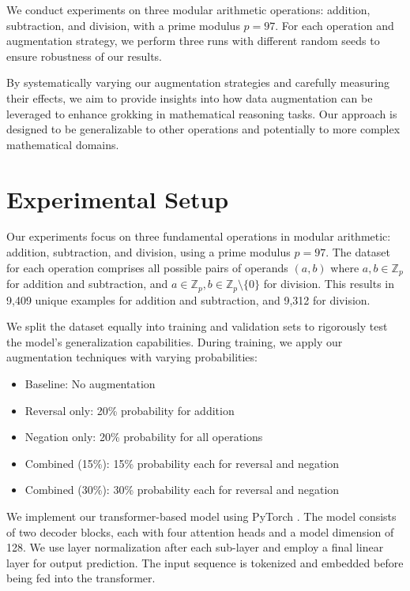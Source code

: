 \documentclass{article} %
\begin{document}
We conduct experiments on three modular arithmetic operations: addition, subtraction, and division, with a prime modulus $p = 97$. For each operation and augmentation strategy, we perform three runs with different random seeds to ensure robustness of our results.

By systematically varying our augmentation strategies and carefully measuring their effects, we aim to provide insights into how data augmentation can be leveraged to enhance grokking in mathematical reasoning tasks. Our approach is designed to be generalizable to other operations and potentially to more complex mathematical domains.

\section{Experimental Setup}
\label{sec:experimental}

Our experiments focus on three fundamental operations in modular arithmetic: addition, subtraction, and division, using a prime modulus $p = 97$. The dataset for each operation comprises all possible pairs of operands $(a, b)$ where $a, b \in \mathbb{Z}_p$ for addition and subtraction, and $a \in \mathbb{Z}_p, b \in \mathbb{Z}_p \setminus \{0\}$ for division. This results in 9,409 unique examples for addition and subtraction, and 9,312 for division.

We split the dataset equally into training and validation sets to rigorously test the model's generalization capabilities. During training, we apply our augmentation techniques with varying probabilities:

\begin{itemize}
    \item Baseline: No augmentation
    \item Reversal only: 20\% probability for addition
    \item Negation only: 20\% probability for all operations
    \item Combined (15\%): 15\% probability each for reversal and negation
    \item Combined (30\%): 30\% probability each for reversal and negation
\end{itemize}

We implement our transformer-based model using PyTorch \cite{paszke2019pytorch}. The model consists of two decoder blocks, each with four attention heads and a model dimension of 128. We use layer normalization \cite{ba2016layer} after each sub-layer and employ a final linear layer for output prediction. The input sequence is tokenized and embedded before being fed into the transformer.
\end{document}

